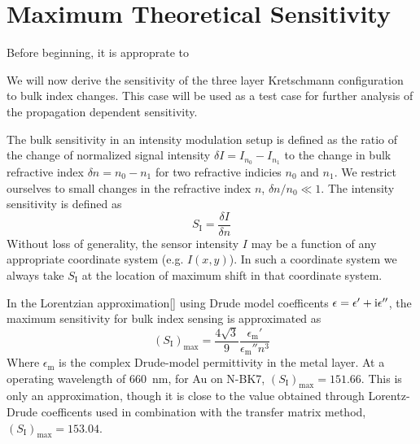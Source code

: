 
\section{Maximum Theoretical Sensitivity}
Before beginning, it is approprate to 

We will now derive the sensitivity of the three layer Kretschmann
configuration to bulk index changes. This case will be used as a test
case for further analysis of the propagation dependent sensitivity.

The bulk sensitivity in an intensity modulation setup is defined as
the ratio of the change of normalized signal intensity $\delta I=I_{n_{0}}-I_{n_{1}}$
to the change in bulk refractive index $\delta n=n_{0}-n_{1}$ for
two refractive indicies $n_{0}$ and $n_{1}$. We restrict ourselves
to small changes in the refractive index $n$, $\delta n/n_{0}\ll1$.
The intensity sensitivity is defined as
\begin{equation}
S_{\mathrm{I}}=\frac{\delta I}{\delta n}
\end{equation}
Without loss of generality, the sensor intensity $I$ may be a function
of any appropriate coordinate system (e.g. $I(x,y)$). In such a coordinate
system we always take $S_{\mathrm{I}}$ at the location of maximum
shift in that coordinate system.

In the Lorentzian approximation{[}{]} using Drude model coefficents
$\epsilon=\epsilon'+{\mathrm{i}}\epsilon''$, the maximum sensitivity for bulk
index sensing is approximated as
\begin{equation}
(S_{\text{I}})_{\text{max}}=\frac{4\sqrt{3}}{9}\frac{\epsilon_{\mathrm{m}}'}{\epsilon_{\mathrm{m}}''n^{3}}
\end{equation}
Where $\epsilon_{\mathrm{m}}$ is the complex Drude-model permittivity
in the metal layer. At a operating wavelength of \SI{660}{\nano\meter},
for Au on N-BK7, $(S_{\mathrm{I}})_{\text{max}}=151.66$. This is
only an approximation, though it is close to the value obtained through
Lorentz-Drude coefficents used in combination with the transfer matrix
method, $(S_{\mathrm{I}})_{\text{max}}=153.04$.
